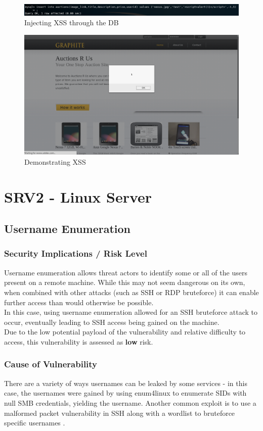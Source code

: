 \documentclass{report}
\begin{document}
\begin{figure}[!htb]
	\centering
	\includegraphics[scale=0.4]{img/xss2.png}
	\caption{Injecting XSS through the DB}
\end{figure}
\begin{figure}[!htb]
	\centering
	\includegraphics[scale=0.3]{img/xss3.png}
	\caption{Demonstrating XSS}
\end{figure}
\pagebreak

\section{SRV2 - Linux Server}
\subsection{Username Enumeration}
\subsubsection{Security Implications / Risk Level}
Username enumeration allows threat actors to identify some or all of the users present on a  remote machine. While this may not seem dangerous on its own, when combined with other attacks (such as SSH or RDP bruteforce) it can enable further access than would otherwise be possible.\\
In this case, using username enumeration allowed for an SSH bruteforce attack to occur, eventually leading to SSH access being gained on the machine.\\
Due to the low potential payload of the vulnerability and relative difficulty to access, this vulnerability is assessed as \textbf{low} risk.
\subsubsection{Cause of Vulnerability}
There are a variety of ways usernames can be leaked by some services - in this case, the usernames were gained by using enum4linux to enumerate SIDs with null SMB credentials, yielding the username. Another common exploit is to use a malformed packet vulnerability in SSH along with a wordlist to bruteforce specific usernames \cite{userenum}.
\end{document}
